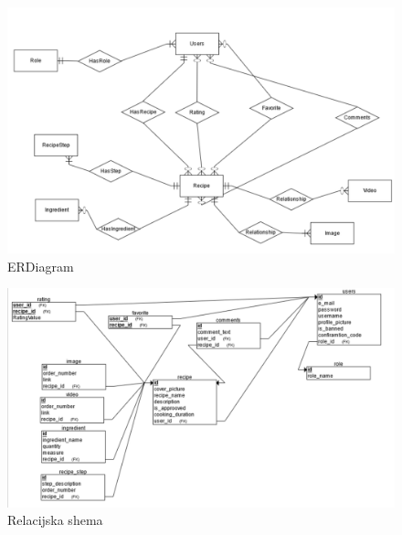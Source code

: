 \documentclass[times, utf8, zavrsni]{fer}
\begin{document}
\begin{figure}[h]
      \includegraphics[width=\textwidth,height=.25\paperheight]{ERDiagram.png}
      \caption{ERDiagram}
      \label{fig:ER Diagram}
\end{figure}
\begin{figure}[h]
      \includegraphics[width=\textwidth,height=.25\paperheight]{RelationalSchema.png}
      \caption{Relacijska shema}
      \label{fig:Relacijska shema}
\end{figure}
\end{document}
